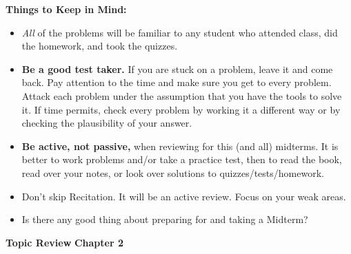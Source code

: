 \documentclass[12pt]{article}
\begin{document}
\textbf{Things to Keep in Mind:}
\begin{itemize}
	\item \emph{All} of the problems will be familiar to any student who attended class, did the homework, and took the quizzes.
	\item \textbf{Be a good test taker.} If you are stuck on a problem, leave it and come back. Pay attention to the time and make sure you get to every problem. Attack each problem under the assumption that you have the tools to solve it. If time permits, check every problem by working it a different way or by checking the plausibility of your answer.
	\item \textbf{Be active, not passive,} when reviewing for this (and all) midterms. It is better to work problems and/or take a practice test, then to read the book, read over your notes, or look over solutions to quizzes/tests/homework.
	\item Don't skip Recitation. It will be an active review. Focus on your weak areas.
	\item Is there any good thing about preparing for and taking a Midterm?
\end{itemize}
\newpage
\textbf{Topic Review}
\textbf{Chapter 2}
\end{document}
